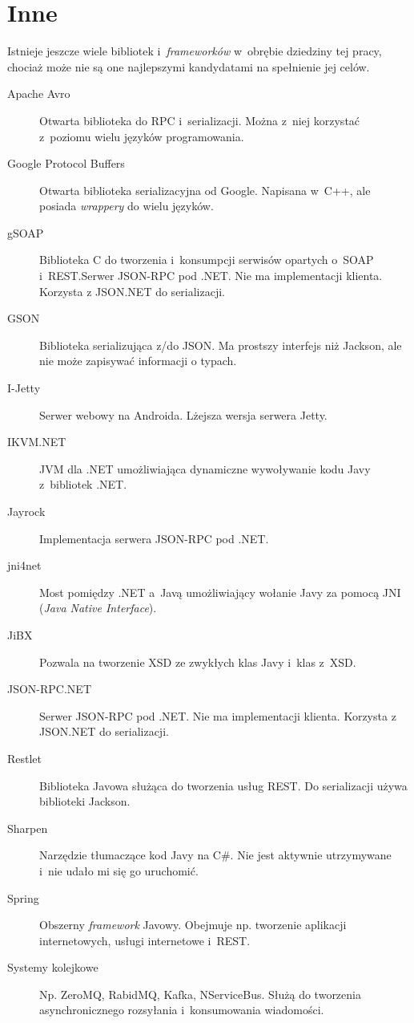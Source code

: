 \section{Inne}
Istnieje jeszcze wiele bibliotek i~\emph{frameworków} w~obrębie dziedziny tej pracy, chociaż może nie są one najlepszymi kandydatami na spełnienie jej celów.

\begin{description}
\item[Apache Avro] Otwarta biblioteka do RPC i~serializacji. Można z~niej korzystać z~poziomu wielu języków programowania.
\item[Google Protocol Buffers] Otwarta biblioteka serializacyjna od Google. Napisana w~C++, ale posiada \emph{wrappery} do wielu języków.
\item[gSOAP] Biblioteka C do tworzenia i~konsumpcji serwisów opartych o~SOAP i~REST.Serwer JSON-RPC pod .NET. Nie ma implementacji klienta. Korzysta z JSON.NET do serializacji.
\item[GSON] Biblioteka serializująca z/do JSON. Ma prostszy interfejs niż Jackson, ale nie może zapisywać informacji o typach.
\item[I-Jetty] Serwer webowy na Androida. Lżejsza wersja serwera Jetty.
\item[IKVM.NET] JVM dla .NET umożliwiająca dynamiczne wywoływanie kodu Javy z~bibliotek .NET.
\item[Jayrock] Implementacja serwera JSON-RPC pod .NET.
\item[jni4net] Most pomiędzy .NET a~Javą umożliwiający wołanie Javy za pomocą JNI (\emph{Java Native Interface}).
\item[JiBX] Pozwala na tworzenie XSD ze zwykłych klas Javy i~klas z~XSD.
\item[JSON-RPC.NET] Serwer JSON-RPC pod .NET. Nie ma implementacji klienta. Korzysta z JSON.NET do serializacji.
\item[Restlet] Biblioteka Javowa służąca do tworzenia usług REST. Do serializacji używa biblioteki Jackson.
\item[Sharpen] Narzędzie tłumaczące kod Javy na C\#. Nie jest aktywnie utrzymywane i~nie udało mi się go uruchomić.
\item[Spring] Obszerny \emph{framework} Javowy. Obejmuje np. tworzenie aplikacji internetowych, usługi internetowe i~REST.
\item[Systemy kolejkowe] Np. ZeroMQ, RabidMQ, Kafka, NServiceBus. Służą do tworzenia asynchronicznego rozsyłania i~konsumowania wiadomości.

\end{description}

